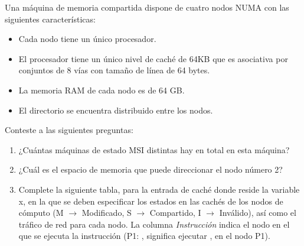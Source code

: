 \begin{acexercise}\end{acexercise}
Una máquina de memoria compartida dispone de cuatro nodos NUMA con las siguientes características:

\begin{itemize}
  \item Cada nodo tiene un único procesador.
  \item El procesador tiene un único nivel de caché de 64KB que es asociativa por conjuntos de 8 vías con tamaño de
línea de 64 bytes.
  \item La memoria RAM de cada nodo es de 64 GB.
  \item El directorio se encuentra distribuido entre los nodos.
\end{itemize}

Conteste a las siguientes preguntas:

\begin{enumerate}

  \item ¿Cuántas máquinas de estado MSI distintas hay en total en esta máquina?

  \item ¿Cuál es el espacio de memoria que puede direccionar el nodo número 2?

  \item Complete la siguiente tabla, para la entrada de caché donde reside la variable x, en la que se deben
        especificar los estados en las cachés de los nodos de cómputo 
        (M $\rightarrow$ Modificado, S $\rightarrow$ Compartido, I $\rightarrow$ Inválido), 
        así como el tráfico de red para cada nodo. 
        La columna \emph{Instrucción} indica el nodo en el que se ejecuta la instrucción
        (P1: , significa ejecutar 
        , en el nodo P1).

\end{enumerate}

